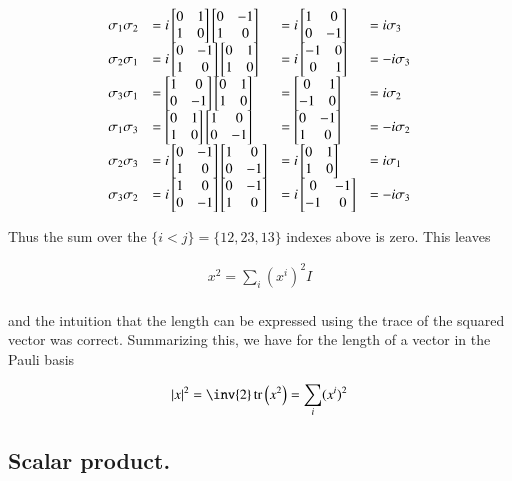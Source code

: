 \documentclass{article}
\DeclareMathOperator{\tr}{tr}
\newcommand{\traceB}[1]{\tr\left({#1}\right)}
\newcommand{\PauliX}[0]{
\begin{bmatrix}
0 & 1 \\
1 & 0 \\
\end{bmatrix}
}
\newcommand{\PauliYNoI}[0]{
\begin{bmatrix}
0 & -1 \\
1 & 0 \\
\end{bmatrix}
}
\newcommand{\PauliZ}[0]{
\begin{bmatrix}
1 & 0 \\
0 & -1 \\
\end{bmatrix}
}
\begin{document}
\begin{align*}
\begin{array}{l l l l}
\sigma_1 \sigma_2 &= i \PauliX \PauliYNoI    &= i \PauliZ                                  &=  i \sigma_3 \\
\sigma_2 \sigma_1 &= i \PauliYNoI \PauliX    &= i \begin{bmatrix}-1 & 0 \\0 & 1\end{bmatrix} &= -i \sigma_3 \\
\sigma_3 \sigma_1 &= \PauliZ \PauliX         &=   \begin{bmatrix}0 & 1 \\-1 & 0\end{bmatrix} &=  i \sigma_2 \\
\sigma_1 \sigma_3 &= \PauliX \PauliZ         &=   \begin{bmatrix}0 & -1 \\1 & 0\end{bmatrix} &= -i \sigma_2 \\
\sigma_2 \sigma_3 &= i \PauliYNoI \PauliZ    &= i \PauliX                                  &=  i \sigma_1 \\
\sigma_3 \sigma_2 &= i \PauliZ \PauliYNoI    &= i \begin{bmatrix}0 & -1 \\-1 & 0\end{bmatrix} &= -i \sigma_3 \\
\end{array}
\end{align*}

Thus the sum over the $\{i < j\} = \{12, 23, 13\}$ indexes above is zero.  This leaves 

\begin{align*}
x^2 = \sum_i (x^i)^2 I \\
\end{align*}

and the intuition that the length can be expressed using the trace of the squared vector was correct.  Summarizing this, we have for the length of a vector in the Pauli basis

\begin{align}
\Abs{x}^2 = \inv{2} \traceB{x^2} = \sum_i (x^i)^2
\end{align}

\subsection{ Scalar product. }
\end{document}
